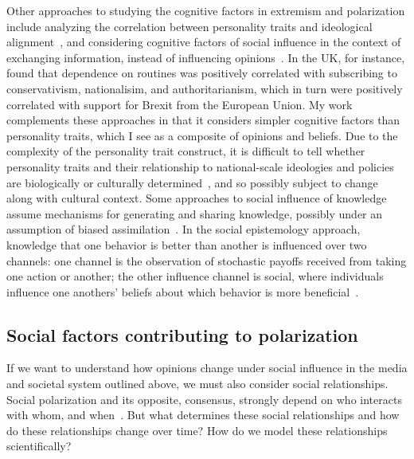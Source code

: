 Other approaches to studying the cognitive factors in extremism and polarization
include analyzing the correlation between personality traits and ideological
alignment~\cite{Rollwage2019}, and considering cognitive factors of social influence 
in the context of exchanging information, instead of influencing opinions~\cite{Carley1990,Carley1991,Bala1998}.
In the UK, for instance,  found that dependence on routines was
positively correlated with subscribing to conservativism, nationalisim, and
authoritarianism, which in turn were positively correlated with support for
Brexit from the European Union. My work complements these approaches in that
it considers simpler cognitive factors than personality traits, which I see
as a composite of opinions and beliefs. Due to the complexity of the
personality trait construct, it is difficult to tell whether personality traits
and their relationship to national-scale ideologies and policies
are biologically or culturally determined~\cite{Claidiere2012c,Smaldino2019d,Falandays2021},
and so possibly subject to change along with cultural context.
Some approaches to social influence of knowledge assume mechanisms for generating and
sharing knowledge, possibly under an assumption of biased 
assimilation~\cite{Mark1998,Mark1998a,Mark2003}. In the social epistemology approach, 
knowledge that one behavior is better than another is influenced over two
channels: one channel is the observation of stochastic payoffs 
received from taking one action or another; the other influence channel is 
social, where individuals influence one anothers' beliefs about which behavior is
more beneficial~\cite{Zollman2007,OConnor2019e}.


\subsection{Social factors contributing to polarization}

If we want to understand how opinions change under social influence in the
media and societal system outlined above, we must also consider
social relationships. Social polarization and its opposite, consensus, strongly
depend on who interacts with whom, and when~\cite{Flache2008,Turner2018}. 
But what determines these social relationships and how do these relationships
change over time? How do we model these relationships 
scientifically? 

